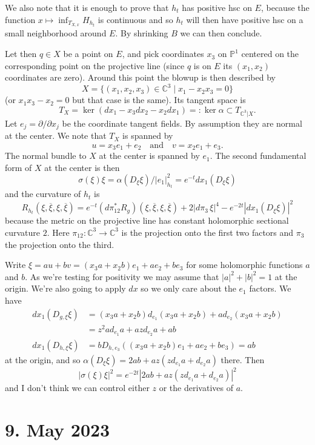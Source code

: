 \documentclass[11pt]{amsart}
\theoremstyle{definition}
\newcommand{\kk}[1]{\mathbb{#1}}
\def\qandq{\quad\text{and}\quad}
\def\ov#1{\overline{#1}}
\begin{document}
We also note that it is enough to prove that $h_t$ has positive hsc on $E$,
because the function $x \mapsto \inf_{T_{X,x}} H_{h_t}$ is continuous
and so $h_t$ will then have positive hsc on a small neighborhood around $E$.
By shrinking $B$ we can then conclude.

Let then $q \in X$ be a point on $E$, and pick coordinates $x_3$ on $\kk P^1$
centered on the corresponding point on the projective line (since $q$ is on $E$
its $(x_1,x_2)$ coordinates are zero).
Around this point the blowup is then described by
$$
X = \{(x_1,x_2,x_3) \in \kk C^3 \mid x_1 - x_2x_3 = 0 \}
$$
(or $x_1x_3 - x_2 = 0$ but that case is the same).
Its tangent space is
$$
T_X = \ker(dx_1 - x_3 dx_2 - x_2 dx_1)
=: \ker \alpha
\subset T_{\kk C^3|X}.
$$
Let $e_j = \partial / \partial x_j$ be the coordinate tangent fields.
By assumption they are normal at the center.
We note that $T_X$ is spanned by
$$
u = x_3 e_1 + e_2
\qandq
v = x_2 e_1 + e_3.
$$
The normal bundle to $X$ at the center is spanned by $e_1$.
The second fundamental form of $X$ at the center is then
$$
\sigma(\xi)\xi
= \alpha(D_\xi \xi) / |e_1|^2_{h_t}
= e^{-t} dx_1(D_\xi \xi)
$$
and the curvature of $h_t$ is
$$
R_{h_t}(\xi, \ov\xi, \xi, \ov\xi)
= e^{-t} (d\pi_{12}^* R_{g})(\xi, \ov\xi, \xi, \ov\xi)
+ 2 |d\pi_{3} \, \xi|^4
- e^{-2t} |dx_1(D_\xi \xi)|^2
$$
because the metric on the projective line has constant holomorphic sectional
curvature $2$.
Here $\pi_{12}: \kk C^3 \to \kk C^3$ is the projection onto the first two factors
and $\pi_3$ the projection onto the third.

Write $\xi = a u + b v = (x_3a + x_2b) e_1 + a e_2 + b e_3$ for some
holomorphic functions $a$ and $b$. As we're testing for positivity we may
assume that $|a|^2 + |b|^2 = 1$ at the origin.
We're also going to apply $dx$ so we only care about the $e_1$ factors.
We have
\begin{align*}
dx_1(D_{g,\xi}\xi)
&= (x_3a + x_2b) d_{e_1}(x_3 a + x_2b)
+ a d_{e_2}(x_3 a + x_2b)
\\
&= z^2 a d_{e_1}a + a z d_{e_2} a + ab
\\
dx_1(D_{h,\xi}\xi)
&= b D_{h,e_3}((x_3a + x_2b) e_1 + a e_2 + b e_3)
= ab
\end{align*}
at the origin, and so
$\alpha(D_{\xi} \xi) = 2 ab + az( z d_{e_1}a + d_{e_2} a)$
there. Then
$$
|\sigma(\xi)\xi|^2
= e^{-2t} |2ab + az( z d_{e_1}a + d_{e_2} a)|^2
$$
and I don't think we can control either $z$ or the derivatives of $a$.


\section{9. May 2023}
\end{document}
